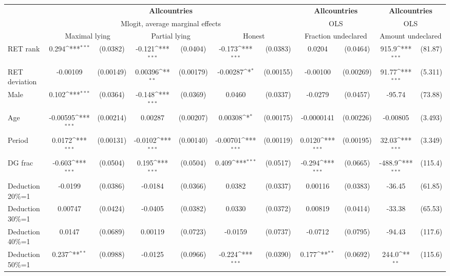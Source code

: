 \def\sym#1{\ifmmode^{#1}\else\(^{#1}\)\fi}
\begin{tabular}{l|cccccc|cc|cc}
\hline\hline
&\multicolumn{6}{c|}{\bf All\space{}countries}&\multicolumn{2}{c|}{\bf All\space{}countries}&\multicolumn{2}{c}{\bf All\space{}countries}\\ &\multicolumn{6}{c|}{Mlogit, average marginal effects }&\multicolumn{2}{c|}{OLS}&\multicolumn{2}{c}{OLS}\\
                &\multicolumn{2}{c}{Maximal lying}&\multicolumn{2}{c}{Partial lying}&\multicolumn{2}{c}{Honest}  &\multicolumn{2}{c}{Fraction undeclared}&\multicolumn{2}{c}{Amount undeclared}\\
\hline
RET rank        &    0.294\sym{***}& (0.0382)&   -0.121\sym{***}& (0.0404)&   -0.173\sym{***}& (0.0383)&   0.0204         & (0.0464)&    915.9\sym{***}&  (81.87)\\
RET deviation   & -0.00109         &(0.00149)&  0.00396\sym{**} &(0.00179)& -0.00287\sym{*}  &(0.00155)& -0.00100         &(0.00269)&    91.77\sym{***}&  (5.311)\\
Male            &    0.102\sym{***}& (0.0364)&   -0.148\sym{***}& (0.0369)&   0.0460         & (0.0337)&  -0.0279         & (0.0457)&   -95.74         &  (73.88)\\
Age             & -0.00595\sym{***}&(0.00214)&  0.00287         &(0.00207)&  0.00308\sym{*}  &(0.00175)&-0.0000141         &(0.00226)& -0.00805         &  (3.493)\\
Period          &   0.0172\sym{***}&(0.00131)&  -0.0102\sym{***}&(0.00140)& -0.00701\sym{***}&(0.00119)&   0.0120\sym{***}&(0.00195)&    32.03\sym{***}&  (3.349)\\
DG frac         &   -0.603\sym{***}& (0.0504)&    0.195\sym{***}& (0.0504)&    0.409\sym{***}& (0.0517)&   -0.294\sym{***}& (0.0665)&   -488.9\sym{***}&  (115.4)\\
Deduction 20\%=1&  -0.0199         & (0.0386)&  -0.0184         & (0.0366)&   0.0382         & (0.0337)&  0.00116         & (0.0383)&   -36.45         &  (61.85)\\
Deduction 30\%=1&  0.00747         & (0.0424)&  -0.0405         & (0.0382)&   0.0330         & (0.0372)&  0.00819         & (0.0414)&   -33.38         &  (65.53)\\
Deduction 40\%=1&   0.0147         & (0.0689)&  0.00119         & (0.0723)&  -0.0159         & (0.0737)&  -0.0712         & (0.0795)&   -94.43         &  (117.6)\\
Deduction 50\%=1&    0.237\sym{**} & (0.0988)&  -0.0125         & (0.0966)&   -0.224\sym{***}& (0.0390)&    0.177\sym{**} & (0.0692)&    244.0\sym{**} &  (115.6)\\

\end{tabular}
